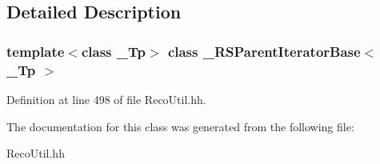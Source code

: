 \subsection{Detailed Description}
\subsubsection*{template$<$class \_\-Tp$>$ class \_\-RSParentIteratorBase$<$ \_\-Tp $>$}



Definition at line 498 of file RecoUtil.hh.

The documentation for this class was generated from the following file:\begin{DoxyCompactItemize}
\item 
RecoUtil.hh\end{DoxyCompactItemize}
